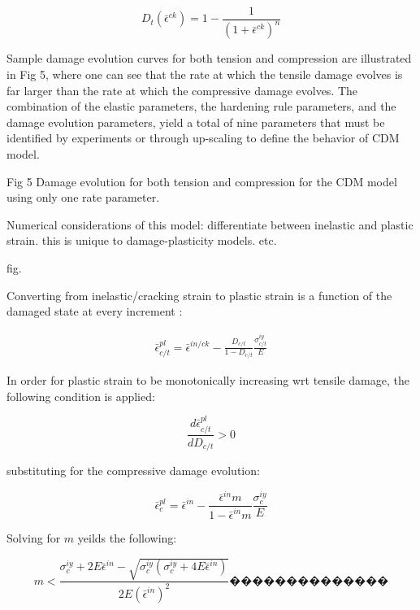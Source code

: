 \begin{equation}
D_{t}\left(\bar{\epsilon}^{ck}\right)=1-\frac{1}{\left(1+\bar{\epsilon}^{ck}\right)^{n}}\label{eqn:param4}
\end{equation}


Sample damage evolution curves for both tension and compression are
illustrated in Fig 5, where one can see that the rate at which the
tensile damage evolves is far larger than the rate at which the compressive
damage evolves. The combination of the elastic parameters, the hardening
rule parameters, and the damage evolution parameters, yield a total
of nine parameters that must be identified by experiments or through
up-scaling to define the behavior of CDM model.

Fig 5 Damage evolution for both tension and compression for the CDM
model using only one rate parameter.

Numerical considerations of this model: differentiate between inelastic and plastic strain. this is unique to damage-plasticity models. etc.

fig.

Converting from inelastic/cracking strain to plastic strain is a function
of the damaged state at every increment :

\begin{multline}
\bar{\epsilon}_{c/t}^{pl}=\bar{\epsilon}^{in/ck}-\frac{D_{c/t}}{1-D_{c/t}}\frac{\sigma_{c/t}^{iy}}{E}\label{eqn:param11}
\end{multline}


In order for plastic strain to be monotonically increasing wrt tensile
damage, the following condition is applied:

\begin{equation}
\frac{d\bar{\epsilon}_{c/t}^{pl}}{dD_{c/t}}>0\label{eqn:param6-1}
\end{equation}


substituting for the compressive damage evolution:

\begin{equation}
\bar{\epsilon}_{c}^{pl}=\bar{\epsilon}^{in}-\frac{\bar{\epsilon}^{in}m}{1-\bar{\epsilon}^{in}m}\frac{\sigma_{c}^{iy}}{E}\label{eqn:param12}
\end{equation}


Solving for $m$ yeilds the following:

\begin{equation}
m<\frac{\sigma_{c}^{iy}+2E\bar{\epsilon}^{in}-\sqrt{\sigma_{c}^{iy}\left(\sigma_{c}^{iy}+4E\bar{\epsilon}^{in}\right)}}{2E\left(\bar{\epsilon}^{in}\right)^{2}}��������������\label{eqn:param13}
\end{equation}


